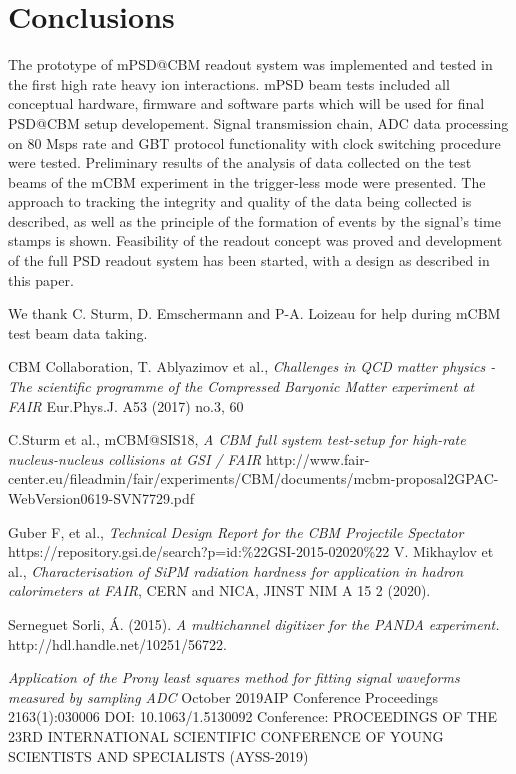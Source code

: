 \documentclass[a4paper,11pt]{article}
\begin{document}
\section{Conclusions}
The prototype of mPSD@CBM readout system was implemented and tested in the first high rate heavy ion interactions. mPSD beam tests included all conceptual hardware, firmware and software parts which will be used for final PSD@CBM setup developement. Signal transmission chain, ADC data processing on 80 Msps rate and GBT protocol functionality with clock switching procedure were tested. Preliminary results of the analysis of data collected on the test beams of the mCBM experiment in the trigger-less mode were presented. The approach to tracking the integrity and quality of the data being collected is described, as well as the principle of the formation of events by the signal's time stamps is shown.
Feasibility of the readout concept was proved and development of the full PSD readout system has been started, with a design as described in this paper.

\acknowledgments
We thank C. Sturm, D. Emschermann and P-A. Loizeau for help during mCBM test beam data taking.

\begin{thebibliography}{99}


CBM Collaboration, T. Ablyazimov et al., \emph{Challenges in QCD matter physics -The scientific programme of the Compressed Baryonic Matter experiment at FAIR} Eur.Phys.J. A53 (2017) no.3, 60 


C.Sturm et al., mCBM@SIS18, \emph{A CBM full system test-setup for high-rate nucleus-nucleus collisions at GSI / FAIR} http://www.fair-center.eu/fileadmin/fair/experiments/CBM/documents/mcbm-proposal2GPAC-WebVersion0619-SVN7729.pdf

Guber F, et al., \emph{Technical Design Report for the CBM Projectile Spectator} https://repository.gsi.de/search?p=id:\%22GSI-2015-02020\%22
V. Mikhaylov et al., \emph{Characterisation of SiPM radiation hardness for application in hadron calorimeters at FAIR}, CERN and NICA, JINST NIM A 15 2 (2020).

Serneguet Sorli, Á. (2015). \emph{A multichannel digitizer for the PANDA experiment.} http://hdl.handle.net/10251/56722.

\emph{Application of the Prony least squares method for fitting signal waveforms measured by sampling ADC}
October 2019AIP Conference Proceedings 2163(1):030006
DOI: 10.1063/1.5130092
Conference: PROCEEDINGS OF THE 23RD INTERNATIONAL SCIENTIFIC CONFERENCE OF YOUNG SCIENTISTS AND SPECIALISTS (AYSS-2019)



\end{thebibliography}
\end{document}
